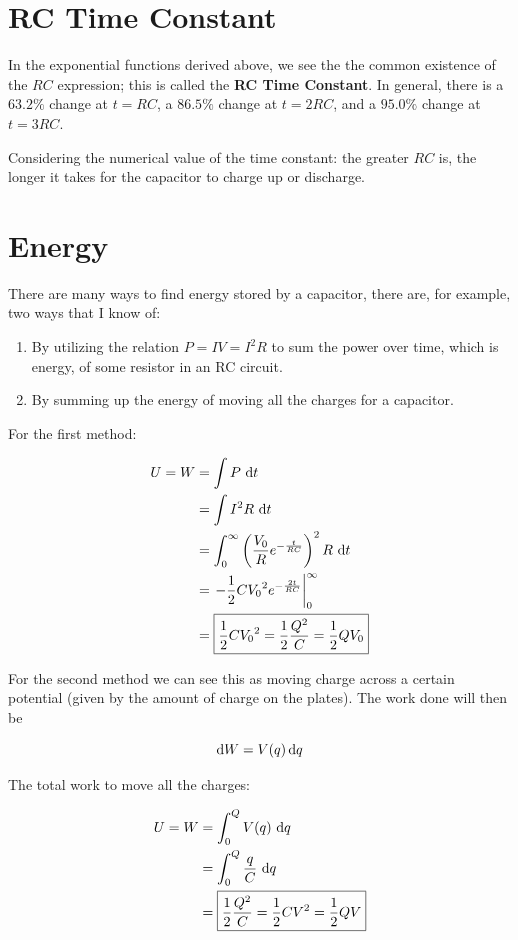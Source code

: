 \section{RC Time Constant}

In the exponential functions derived above, we see the the common existence of the $RC$ expression; this is called the \textbf{RC Time Constant}. In general, there is a $63.2\%$ change at $t = RC$, a $86.5\%$ change at $t = 2RC$, and a $95.0\%$ change at $t = 3RC$.

Considering the numerical value of the time constant: the greater $RC$ is, the longer it takes for the capacitor to charge up or discharge.

\section{Energy}

There are many ways to find energy stored by a capacitor, there are, for example, two ways that I know of:
\begin{enumerate}[1.]
    \item By utilizing the relation $P = IV = I^2R$ to sum the power over time, which is energy, of some resistor in an RC circuit.
    \item By summing up the energy of moving all the charges for a capacitor.
\end{enumerate}

For the first method:

\begin{align*}
    U = W &= \int P \,\dif t\\
    &= \int I^2R \,\dif t\\
    &= \int_0^\infty \left(\frac{V_0}{R} e^{-\frac{t}{RC}}\right)^2 R \,\dif t\\
    &= \left.-\frac{1}{2} C{V_0}^2 e^{-\frac{2t}{RC}}\right\vert_0^\infty\\
    &= \boxed{\frac{1}{2} C{V_0}^2 = \frac{1}{2} \frac{Q^2}{C} = \frac{1}{2}QV_0}\\
\end{align*}

For the second method we can see this as moving charge across a certain potential (given by the amount of charge on the plates). The work done will then be

\[\dif W = V(q) \dif q\]

The total work to move all the charges:

\begin{align*}
    U  = W &= \int_0^Q V(q) \,\dif q\\
    &= \int_0^Q \frac{q}{C} \,\dif q\\
    &= \boxed{\frac{1}{2} \frac{Q^2}{C} = \frac{1}{2}CV^2 = \frac{1}{2}QV}
\end{align*}

